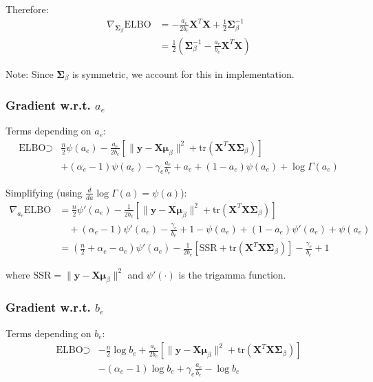 \documentclass[11pt]{article}
\newcommand{\ELBO}{\text{ELBO}}
\newcommand{\tr}{\text{tr}}
\begin{document}
Therefore:
\begin{align}
\nabla_{\bm{\Sigma}_\beta} \ELBO &= -\frac{a_e}{2b_e} \bm{X}^T\bm{X} + \frac{1}{2}\bm{\Sigma}_\beta^{-1} \nonumber\\
&= \frac{1}{2}\left(\bm{\Sigma}_\beta^{-1} - \frac{a_e}{b_e} \bm{X}^T\bm{X}\right)
\label{eq:grad_Sigma}
\end{align}

Note: Since $\bm{\Sigma}_\beta$ is symmetric, we account for this in implementation.

\subsubsection{Gradient w.r.t. \texorpdfstring{$a_e$}{a_e}}

Terms depending on $a_e$:
\begin{align}
\ELBO \supset &\frac{n}{2}\psi(a_e) - \frac{a_e}{2b_e}\left[\|\bm{y} - \bm{X}\bm{\mu}_\beta\|^2 + \tr(\bm{X}^T\bm{X}\bm{\Sigma}_\beta)\right] \nonumber\\
&+ (\alpha_e - 1)\psi(a_e) - \gamma_e \frac{a_e}{b_e} + a_e + (1-a_e)\psi(a_e) + \log\Gamma(a_e)
\end{align}

Simplifying (using $\frac{d}{da}\log\Gamma(a) = \psi(a)$):
\begin{align}
\nabla_{a_e} \ELBO &= \frac{n}{2}\psi'(a_e) - \frac{1}{2b_e}\left[\|\bm{y} - \bm{X}\bm{\mu}_\beta\|^2 + \tr(\bm{X}^T\bm{X}\bm{\Sigma}_\beta)\right] \nonumber\\
&\quad + (\alpha_e - 1)\psi'(a_e) - \frac{\gamma_e}{b_e} + 1 - \psi(a_e) + (1-a_e)\psi'(a_e) + \psi(a_e) \nonumber\\
&= \left(\frac{n}{2} + \alpha_e - a_e\right)\psi'(a_e) - \frac{1}{2b_e}\left[\text{SSR} + \tr(\bm{X}^T\bm{X}\bm{\Sigma}_\beta)\right] - \frac{\gamma_e}{b_e} + 1
\label{eq:grad_a}
\end{align}

where $\text{SSR} = \|\bm{y} - \bm{X}\bm{\mu}_\beta\|^2$ and $\psi'(\cdot)$ is the trigamma function.

\subsubsection{Gradient w.r.t. \texorpdfstring{$b_e$}{b_e}}

Terms depending on $b_e$:
\begin{align}
\ELBO \supset &-\frac{n}{2}\log b_e + \frac{a_e}{2b_e}\left[\|\bm{y} - \bm{X}\bm{\mu}_\beta\|^2 + \tr(\bm{X}^T\bm{X}\bm{\Sigma}_\beta)\right] \nonumber\\
&- (\alpha_e - 1)\log b_e + \gamma_e \frac{a_e}{b_e} - \log b_e
\end{align}
\end{document}
